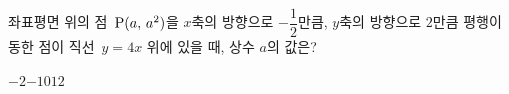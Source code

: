좌표평면 위의 점~$\mathrm{P}(a,\mkern3mu a^2)$을 $x$축의 방향으로 $-\dfrac{1}{2}$만큼, $y$축의 방향으로 $2$만큼 평행이동한 점이 직선~$y=4x$ 위에 있을 때, 상수 $a$의 값은?
\begin{choices32}{$-2$}{$-1$}{$0$}{$1$}{$2$}\end{choices32}
